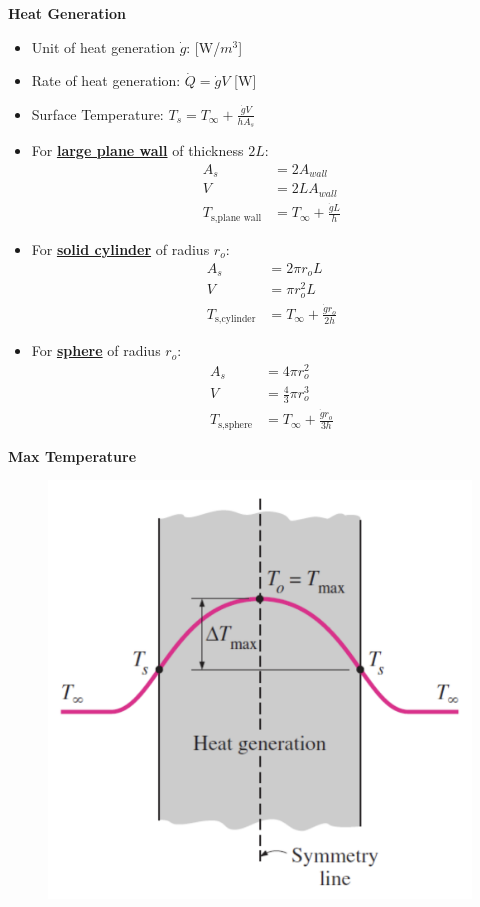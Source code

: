 \large\textbf{Heat Generation}
\begin{itemize}
    \item Unit of heat generation $\dot{g}$: [W/$m^3$]
    \item Rate of heat generation: $\dot{Q}=\dot{g}V$ [W]
    \item Surface Temperature: $T_s = T_{\infty}+\frac{\dot{g}V}{h A_s}$
    \item For \underline{\textbf{large plane wall}} of thickness $2L$:
    \begin{align*}
        A_s&=2A_{wall} \\
        V &=2LA_{wall} \\
        T_{\text{s,plane wall}} &= T_{\infty}+\frac{\dot{g}L}{h}
    \end{align*}
    \item For \underline{\textbf{solid cylinder}} of radius $r_o$:
    \begin{align*}
        A_s &= 2\pi r_o L \\
        V &=\pi r_o^2 L \\
        T_{\text{s,cylinder}} &= T_{\infty} + \frac{\dot{g}r_o}{2h}
    \end{align*}
    \item For \underline{\textbf{sphere}} of radius $r_o$:
    \begin{align*}
        A_s &= 4\pi r_o^2 \\
        V &= \frac{4}{3} \pi r_o^3 \\
        T_{\text{s,sphere}} &= T_{\infty} + \frac{\dot{g}r_o}{3h} 
    \end{align*}
\end{itemize}

\large\textbf{Max Temperature}
\begin{figure}[h]
    \centering
    \includegraphics[width=0.75\linewidth]{images/heat_generation_max_temp.png}
\end{figure}

